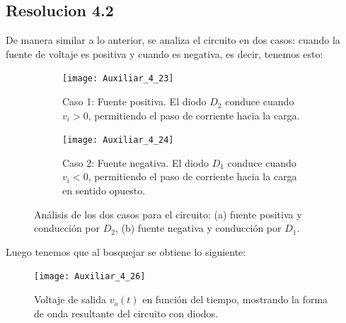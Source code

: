 \documentclass[
  11pt,
  letterpaper,
   addpoints,
   answers
  ]{exam}
\begin{document}
\begin{questions}
\begin{solution}
    \subsection*{Resolucion 4.2}
  De manera similar a lo anterior, se analiza el circuito en dos casos: cuando la fuente de voltaje es positiva y cuando es negativa, es decir, tenemos esto:

    \begin{figure}[H]
      \centering
      \begin{subfigure}[b]{0.48\textwidth}
        \centering
        \texttt{[image: Auxiliar\_4\_23]}
        \caption{Caso 1: Fuente positiva. El diodo $D_2$ conduce cuando $v_i > 0$, permitiendo el paso de corriente hacia la carga.}
        \label{fig:resolucion4.2a}
      \end{subfigure}\hfill
      \begin{subfigure}[b]{0.48\textwidth}
        \centering
        \texttt{[image: Auxiliar\_4\_24]}
        \caption{Caso 2: Fuente negativa. El diodo $D_1$ conduce cuando $v_i < 0$, permitiendo el paso de corriente hacia la carga en sentido opuesto.}
        \label{fig:resolucion4.2b}
      \end{subfigure}
      \caption{Análisis de los dos casos para el circuito: (a) fuente positiva y conducción por $D_2$, (b) fuente negativa y conducción por $D_1$.}
      \label{fig:resolucion4.2}
    \end{figure}
Luego tenemos que al bosquejar se obtiene lo siguiente:
\begin{figure}[H]
  \centering
  \texttt{[image: Auxiliar\_4\_26]}
  \caption{Voltaje de salida \(v_o(t)\) en función del tiempo, mostrando la forma de onda resultante del circuito con diodos.}
  \label{fig:voltaje-salida-4.2}
\end{figure}
\end{solution}
\end{questions}
\end{document}
